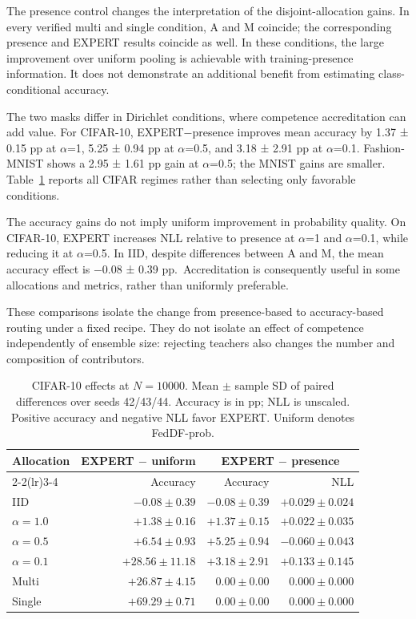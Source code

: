 The presence control changes the interpretation of the disjoint-allocation gains. In every verified multi and single condition, A and M coincide; the corresponding presence and EXPERT results coincide as well. In these conditions, the large improvement over uniform pooling is achievable with training-presence information. It does not demonstrate an additional benefit from estimating class-conditional accuracy.

The two masks differ in Dirichlet conditions, where competence accreditation can add value. For CIFAR-10, EXPERT−presence improves mean accuracy by 1.37 ± 0.15 pp at \(\alpha\)=1, 5.25 ± 0.94 pp at \(\alpha\)=0.5, and 3.18 ± 2.91 pp at \(\alpha\)=0.1. Fashion-MNIST shows a 2.95 ± 1.61 pp gain at \(\alpha\)=0.5; the MNIST gains are smaller. Table~\ref{tab:cifar} reports all CIFAR regimes rather than selecting only favorable conditions.

The accuracy gains do not imply uniform improvement in probability quality. On CIFAR-10, EXPERT increases NLL relative to presence at \(\alpha\)=1 and \(\alpha\)=0.1, while reducing it at \(\alpha\)=0.5. In IID, despite differences between A and M, the mean accuracy effect is −0.08 ± 0.39 pp.~Accreditation is consequently useful in some allocations and metrics, rather than uniformly preferable.

These comparisons isolate the change from presence-based to accuracy-based routing under a fixed recipe. They do not isolate an effect of competence independently of ensemble size: rejecting teachers also changes the number and composition of contributors.

\begin{table}[htbp]
\centering
\caption{CIFAR-10 effects at $N=10000$. Mean $\pm$ sample SD of paired differences over seeds 42/43/44. Accuracy is in pp; NLL is unscaled. Positive accuracy and negative NLL favor EXPERT. Uniform denotes FedDF-prob.}
\label{tab:cifar}
\small
\begin{tabular}{lrrr}
\toprule
Allocation & \multicolumn{1}{c}{EXPERT $-$ uniform} & \multicolumn{2}{c}{EXPERT $-$ presence} \\
\cmidrule(lr){2-2}\cmidrule(lr){3-4}
 & Accuracy & Accuracy & NLL \\
\midrule
IID & $-0.08\pm0.39$ & $-0.08\pm0.39$ & $+0.029\pm0.024$ \\
$\alpha=1.0$ & $+1.38\pm0.16$ & $+1.37\pm0.15$ & $+0.022\pm0.035$ \\
$\alpha=0.5$ & $+6.54\pm0.93$ & $+5.25\pm0.94$ & $-0.060\pm0.043$ \\
$\alpha=0.1$ & $+28.56\pm11.18$ & $+3.18\pm2.91$ & $+0.133\pm0.145$ \\
Multi & $+26.87\pm4.15$ & $0.00\pm0.00$ & $0.000\pm0.000$ \\
Single & $+69.29\pm0.71$ & $0.00\pm0.00$ & $0.000\pm0.000$ \\
\bottomrule
\end{tabular}
\end{table}

